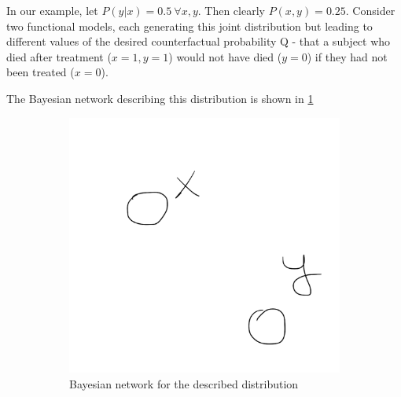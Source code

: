 \documentclass[fleqn]{article}
\numberwithin{equation}{section}
\numberwithin{theorem}{section}
\numberwithin{figure}{section}
\numberwithin{lemma}{section}
\numberwithin{corollary}{section}
\begin{document}
In our example, let $P(y|x) = 0.5 \ \forall x, y$. Then clearly $P(x,y) = 0.25$. Consider two functional models, each generating this joint distribution but leading to different values of the desired counterfactual probability Q - that a subject who died after treatment ($x=1, y=1$) would not have died ($y = 0$) if they had not been treated ($x=0$). 

The Bayesian network describing this distribution is shown in \ref{fig:treatment_sample_bn}

\begin{figure}[!tbph]
	\centering
	\begin{subfigure}[t]{0.3\textwidth}
		\includegraphics[width=\textwidth]{imgs/img12.png}
		\caption{Bayesian network for the described distribution}
		\label{fig:treatment_sample_bn}
	\end{subfigure}
	\begin{subfigure}[t]{0.25\textwidth}

\end{subfigure}
\end{figure}
\end{document}
